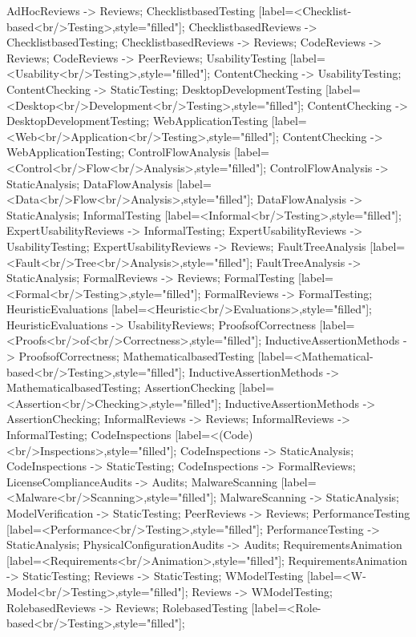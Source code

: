 \documentclass{article}
\begin{document}
{AdHocReviews -> Reviews;
ChecklistbasedTesting [label=<Checklist-based<br/>Testing>,style="filled"];
ChecklistbasedReviews -> ChecklistbasedTesting;
ChecklistbasedReviews -> Reviews;
CodeReviews -> Reviews;
CodeReviews -> PeerReviews;
UsabilityTesting [label=<Usability<br/>Testing>,style="filled"];
ContentChecking -> UsabilityTesting;
ContentChecking -> StaticTesting;
DesktopDevelopmentTesting [label=<Desktop<br/>Development<br/>Testing>,style="filled"];
ContentChecking -> DesktopDevelopmentTesting;
WebApplicationTesting [label=<Web<br/>Application<br/>Testing>,style="filled"];
ContentChecking -> WebApplicationTesting;
ControlFlowAnalysis [label=<Control<br/>Flow<br/>Analysis>,style="filled"];
ControlFlowAnalysis -> StaticAnalysis;
DataFlowAnalysis [label=<Data<br/>Flow<br/>Analysis>,style="filled"];
DataFlowAnalysis -> StaticAnalysis;
InformalTesting [label=<Informal<br/>Testing>,style="filled"];
ExpertUsabilityReviews -> InformalTesting;
ExpertUsabilityReviews -> UsabilityTesting;
ExpertUsabilityReviews -> Reviews;
FaultTreeAnalysis [label=<Fault<br/>Tree<br/>Analysis>,style="filled"];
FaultTreeAnalysis -> StaticAnalysis;
FormalReviews -> Reviews;
FormalTesting [label=<Formal<br/>Testing>,style="filled"];
FormalReviews -> FormalTesting;
HeuristicEvaluations [label=<Heuristic<br/>Evaluations>,style="filled"];
HeuristicEvaluations -> UsabilityReviews;
ProofsofCorrectness [label=<Proofs<br/>of<br/>Correctness>,style="filled"];
InductiveAssertionMethods -> ProofsofCorrectness;
MathematicalbasedTesting [label=<Mathematical-based<br/>Testing>,style="filled"];
InductiveAssertionMethods -> MathematicalbasedTesting;
AssertionChecking [label=<Assertion<br/>Checking>,style="filled"];
InductiveAssertionMethods -> AssertionChecking;
InformalReviews -> Reviews;
InformalReviews -> InformalTesting;
CodeInspections [label=<(Code)<br/>Inspections>,style="filled"];
CodeInspections -> StaticAnalysis;
CodeInspections -> StaticTesting;
CodeInspections -> FormalReviews;
LicenseComplianceAudits -> Audits;
MalwareScanning [label=<Malware<br/>Scanning>,style="filled"];
MalwareScanning -> StaticAnalysis;
ModelVerification -> StaticTesting;
PeerReviews -> Reviews;
PerformanceTesting [label=<Performance<br/>Testing>,style="filled"];
PerformanceTesting -> StaticAnalysis;
PhysicalConfigurationAudits -> Audits;
RequirementsAnimation [label=<Requirements<br/>Animation>,style="filled"];
RequirementsAnimation -> StaticTesting;
Reviews -> StaticTesting;
WModelTesting [label=<W-Model<br/>Testing>,style="filled"];
Reviews -> WModelTesting;
RolebasedReviews -> Reviews;
RolebasedTesting [label=<Role-based<br/>Testing>,style="filled"];
}
\end{document}

